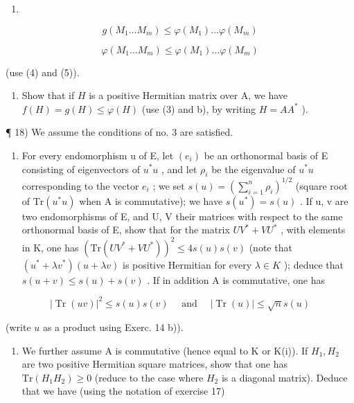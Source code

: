 \begin{enumerate}
\def\labelenumi{(\arabic{enumi})}
\setcounter{enumi}{5}
\tightlist
\item
\end{enumerate}

\[
g (M _ {1} \dots M _ {m}) \leqslant \varphi (M _ {1}) \dots \varphi (M _ {m})\tag{7}
\]

\[
\varphi (M _ {1} \dots M _ {m}) \leqslant \varphi (M _ {1}) \dots \varphi (M _ {m})
\]

(use (4) and (5)).

\begin{enumerate}
\def\labelenumi{\alph{enumi})}
\setcounter{enumi}{2}
\tightlist
\item
  Show that if \(H\) is a positive Hermitian matrix over A, we have \(f(H) = g(H) \leqslant \varphi(H)\) (use (3) and b), by writing \(H = AA^{*}\) ).
\end{enumerate}

¶ 18) We assume the conditions of no. 3 are satisfied.

\begin{enumerate}
\def\labelenumi{\alph{enumi})}
\tightlist
\item
  For every endomorphism u of E, let \((e_{i})\) be an orthonormal basis of E consisting of eigenvectors of \(u^{*}u\) , and let \(\rho_{i}\) be the eigenvalue of \(u^{*}u\) corresponding to the vector \(e_{i}\) ; we set \(s(u) = (\sum_{i=1}^{n} \rho_{i})^{1/2}\) (square root of \(\mathrm{Tr}(u^{*}u)\) when A is commutative); we have \(s(u^{*}) = s(u)\) . If u, v are two endomorphisms of E, and U, V their matrices with respect to the same orthonormal basis of E, show that for the matrix \(UV^{*} + VU^{*}\) , with elements in K, one has \((\mathrm{Tr}(UV^{*} + VU^{*}))^{2} \leqslant 4s(u)s(v)\) (note that \((u^{*} + \lambda v^{*})(u + \lambda v)\) is positive Hermitian for every \(\lambda \in K\) ); deduce that \(s(u + v) \leqslant s(u) + s(v)\) . If in addition A is commutative, one has
\end{enumerate}

\[
\left| \operatorname{Tr} (u v) \right| ^ {2} \leqslant s (u) s (v) \quad \text { and } \quad \left| \operatorname{Tr} (u) \right| \leqslant \sqrt {n} s (u)
\]

(write \(u\) as a product using Exerc. 14 b)).

\begin{enumerate}
\def\labelenumi{\alph{enumi})}
\setcounter{enumi}{1}
\tightlist
\item
  We further assume A is commutative (hence equal to K or K(i)). If \(H_{1}, H_{2}\) are two positive Hermitian square matrices, show that one has \(\mathrm{Tr}(H_{1}H_{2}) \geqslant 0\) (reduce to the case where \(H_{2}\) is a diagonal matrix). Deduce that we have (using the notation of exercise 17)
\end{enumerate}

